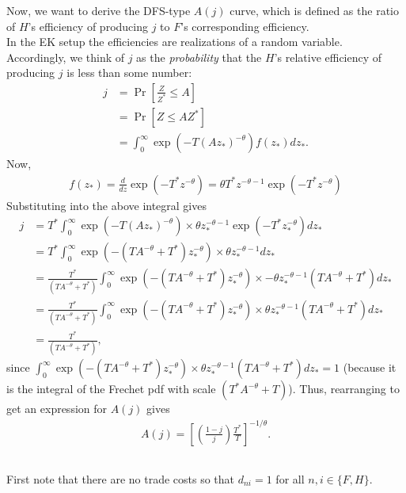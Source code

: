 \documentclass[12pt]{article}
\begin{document}
Now, we want to derive the DFS-type $A(j)$ curve, which is defined as the ratio of $H$'s efficiency of producing $j$ to $F$'s corresponding efficiency.\\

In the EK setup the efficiencies are realizations of a random variable. Accordingly, we think of $j$ as the \textit{probability} that the $H$'s relative efficiency of producing $j$ is less than some number:
\begin{align*}
j &= \Pr\left[\frac{Z}{Z^*} \leq A\right]\\
&=\Pr\left[Z \leq AZ^*\right]\\
&= \int_0^\infty \exp(-T(Az_*)^{-\theta}) f(z_*)dz_*.
\end{align*}
Now,
\begin{align*}
f(z_*) = \frac{d}{dz} \exp(-T^*z^{-\theta}) = \theta T^*z^{-\theta-1}\exp(-T^*z^{-\theta})
\end{align*}
Substituting into the above integral gives
\begin{align*}
j &= T^*\int_0^\infty \exp(-T(Az_*)^{-\theta}) \times \theta z_*^{-\theta-1}\exp(-T^*z_*^{-\theta})dz_*\\
&=T^*\int_0^\infty \exp(-(TA^{-\theta}+T^*)z_*^{-\theta}) \times\theta z_*^{-\theta-1}dz_*\\
&= \frac{T^*}{(TA^{-\theta}+T^*)} \int_0^\infty \exp(-(TA^{-\theta}+T^*)z_*^{-\theta}) \times -\theta z_*^{-\theta-1}(TA^{-\theta}+T^*)dz_*\\
&=\frac{T^*}{(TA^{-\theta}+T^*)} \int_0^\infty \exp(-(TA^{-\theta}+T^*)z_*^{-\theta}) \times \theta z_*^{-\theta-1}(TA^{-\theta}+T^*)dz_*\\
&=\frac{T^*}{(TA^{-\theta}+T^*)},
\end{align*}
since $ \int_0^\infty \exp(-(TA^{-\theta}+T^*)z_*^{-\theta}) \times \theta z_*^{-\theta-1}(TA^{-\theta}+T^*)dz_* = 1$ (because it is the integral of the Frechet pdf with scale $(T^*A^{-\theta}+T)$). Thus, rearranging to get an expression for $A(j)$ gives
\begin{align}
A(j) = \left[\left(\frac{1-j}{j}\right)\frac{T^*}{T}\right]^{-1/\theta}. \label{eq:EK0}
\end{align}

\newpage

\subsection{}
First note that there are no trade costs so that $d_{ni} = 1$ for all $n,i \in \{F,H\}$.\\
\end{document}
